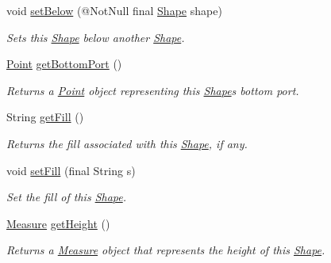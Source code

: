 \begin{DoxyCompactItemize}
void \hyperlink{classcom_1_1aarrelaakso_1_1drawl_1_1_shape_a4147526667449f5beb534d4404ba8f77}{set\+Below} (@Not\+Null final \hyperlink{classcom_1_1aarrelaakso_1_1drawl_1_1_shape}{Shape} shape)
\begin{DoxyCompactList}\small\item\em Sets this \hyperlink{classcom_1_1aarrelaakso_1_1drawl_1_1_shape}{Shape} below another \hyperlink{classcom_1_1aarrelaakso_1_1drawl_1_1_shape}{Shape}. \end{DoxyCompactList}\item 
\hyperlink{classcom_1_1aarrelaakso_1_1drawl_1_1_point}{Point} \hyperlink{classcom_1_1aarrelaakso_1_1drawl_1_1_shape_aba14efe9a16c0808580963c66b171082}{get\+Bottom\+Port} ()
\begin{DoxyCompactList}\small\item\em Returns a \hyperlink{classcom_1_1aarrelaakso_1_1drawl_1_1_point}{Point} object representing this \hyperlink{classcom_1_1aarrelaakso_1_1drawl_1_1_shape}{Shape}\textquotesingle{}s bottom port. \end{DoxyCompactList}\item 
String \hyperlink{classcom_1_1aarrelaakso_1_1drawl_1_1_shape_a0d9a33a3e151aaceeec140bea343a650}{get\+Fill} ()
\begin{DoxyCompactList}\small\item\em Returns the fill associated with this \hyperlink{classcom_1_1aarrelaakso_1_1drawl_1_1_shape}{Shape}, if any. \end{DoxyCompactList}\item 
void \hyperlink{classcom_1_1aarrelaakso_1_1drawl_1_1_shape_a81ff4feb49b8f74c1a639564748a23ee}{set\+Fill} (final String s)
\begin{DoxyCompactList}\small\item\em Set the fill of this \hyperlink{classcom_1_1aarrelaakso_1_1drawl_1_1_shape}{Shape}. \end{DoxyCompactList}\item 
\hyperlink{classcom_1_1aarrelaakso_1_1drawl_1_1_measure}{Measure} \hyperlink{classcom_1_1aarrelaakso_1_1drawl_1_1_shape_ac9f74d31c332aab76b329edc22080e67}{get\+Height} ()
\begin{DoxyCompactList}\small\item\em Returns a \hyperlink{classcom_1_1aarrelaakso_1_1drawl_1_1_measure}{Measure} object that represents the height of this \hyperlink{classcom_1_1aarrelaakso_1_1drawl_1_1_shape}{Shape}. \end{DoxyCompactList}\item 

\end{DoxyCompactItemize}
